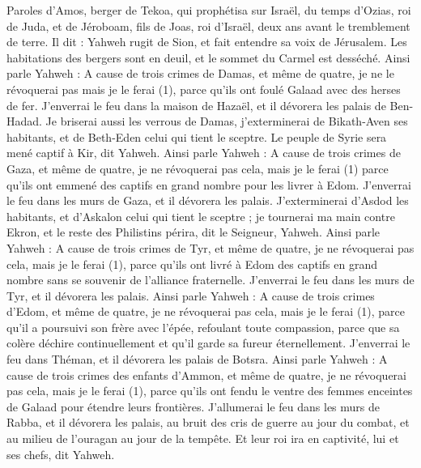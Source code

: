 \BFont
\begin{multicols}{2}
\VerseOne{}Paroles d'Amos, berger de Tekoa, qui prophétisa sur Israël, du temps d’Ozias, roi de Juda, et de Jéroboam, fils de Joas, roi d'Israël, deux ans avant le tremblement de terre.
Il dit : Yahweh rugit de Sion, et fait entendre sa voix de Jérusalem. Les habitations des bergers sont en deuil, et le sommet du Carmel est desséché.
Ainsi parle Yahweh : A cause de trois crimes de Damas, et même de quatre, je ne le révoquerai pas mais je le ferai (1), parce qu'ils ont foulé Galaad avec des herses de fer.
J'enverrai le feu dans la maison de Hazaël, et il dévorera les palais de Ben-Hadad.
Je briserai aussi les verrous de Damas, j'exterminerai de Bikath-Aven ses habitants, et de Beth-Eden celui qui tient le sceptre. Le peuple de Syrie sera mené captif à Kir, dit Yahweh.
Ainsi parle Yahweh : A cause de trois crimes de Gaza, et même de quatre, je ne révoquerai pas cela, mais je le ferai (1) parce qu'ils ont emmené des captifs en grand nombre pour les livrer à Edom.
J'enverrai le feu dans les murs de Gaza, et il dévorera les palais.
J'exterminerai d'Asdod les habitants, et d'Askalon celui qui tient le sceptre ; je tournerai ma main contre Ekron, et le reste des Philistins périra, dit le Seigneur, Yahweh.
Ainsi parle Yahweh : A cause de trois crimes de Tyr, et même de quatre, je ne révoquerai pas cela, mais je le ferai (1), parce qu'ils ont livré à Edom des captifs en grand nombre sans se souvenir de l'alliance fraternelle.
J'enverrai le feu dans les murs de Tyr, et il dévorera les palais.
Ainsi parle Yahweh : A cause de trois crimes d'Edom, et même de quatre, je ne révoquerai pas cela, mais je le ferai (1), parce qu'il a poursuivi son frère avec l'épée, refoulant toute compassion, parce que sa colère déchire continuellement et qu'il garde sa fureur éternellement.
J'enverrai le feu dans Théman, et il dévorera les palais de Botsra.
Ainsi parle Yahweh : A cause de trois crimes des enfants d'Ammon, et même de quatre, je ne révoquerai pas cela, mais je le ferai (1), parce qu’ils ont fendu le ventre des femmes enceintes de Galaad pour étendre leurs frontières.
J'allumerai le feu dans les murs de Rabba, et il dévorera les palais, au bruit des cris de guerre au jour du combat, et au milieu de l’ouragan au jour de la tempête.
Et leur roi ira en captivité, lui et ses chefs, dit Yahweh.

\end{multicols}

